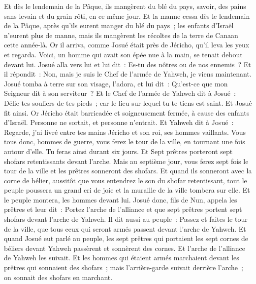 \begin{multicols}{2}
Et dès le lendemain de la Pâque, ils mangèrent du blé du pays, savoir, des pains sans levain et du grain rôti, en ce même jour.
Et la manne cessa dès le lendemain de la Pâque, après qu'ils eurent manger du blé du pays~; les enfants d'Israël n'eurent plus de manne, mais ils mangèrent les récoltes de la terre de Canaan cette année-là.
Or il arriva, comme Josué était près de Jéricho, qu'il leva les yeux et regarda. Voici, un homme qui avait son épée nue à la main, se tenait debout devant lui. Josué alla vers lui et lui dit~: Es-tu des nôtres ou de nos ennemis~?
Et il répondit~: Non, mais je suis le Chef de l'armée de Yahweh, je viens maintenant. Josué tomba à terre sur son visage, l'adora, et lui dit~: Qu'est-ce que mon Seigneur dit à son serviteur~?
Et le Chef de l'armée de Yahweh dit à Josué~: Délie tes souliers de tes pieds~; car le lieu sur lequel tu te tiens est saint. Et Josué fit ainsi.
\VerseOne{}Or Jéricho était barricadée et soigneusement fermée, à cause des enfants d'Israël. Personne ne sortait, et personne n'entrait.
Et Yahweh dit à Josué~: Regarde, j'ai livré entre tes mains Jéricho et son roi, ses hommes vaillants.
Vous tous donc, hommes de guerre, vous ferez le tour de la ville, en tournant une fois autour d'elle. Tu feras ainsi durant six jours.
Et Sept prêtres porteront sept shofars retentissants devant l'arche. Mais au septième jour, vous ferez sept fois le tour de la ville et les prêtres sonneront des shofars.
Et quand ils sonneront avec la corne de bélier, aussitôt que vous entendrez le son du shofar retentissant, tout le peuple poussera un grand cri de joie et la muraille de la ville tombera sur elle. Et le peuple montera, les hommes devant lui.
Josué donc, fils de Nun, appela les prêtres et leur dit~: Portez l'arche de l'alliance et que sept prêtres portent sept shofars devant l'arche de Yahweh.
Il dit aussi au peuple~: Passez et faites le tour de la ville, que tous ceux qui seront armés passent devant l'arche de Yahweh.
Et quand Josué eut parlé au peuple, les sept prêtres qui portaient les sept cornes de béliers devant Yahweh passèrent et sonnèrent des cornes. Et l'arche de l'alliance de Yahweh les suivait.
Et les hommes qui étaient armés marchaient devant les prêtres qui sonnaient des shofars~; mais l'arrière-garde suivait derrière l'arche~; on sonnait des shofars en marchant.

\end{multicols}
